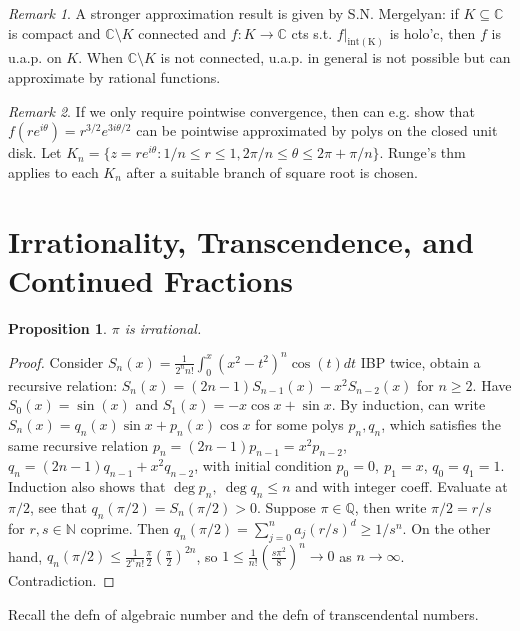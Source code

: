 \documentclass{article}
\theoremstyle{definition}
\theoremstyle{remark}
\newtheorem{rem}{Remark}
\theoremstyle{plain}
\newtheorem{prop}[defn]{Proposition}
\newcommand{\NN}{\mathbb{N}}
\newcommand{\QQ}{\mathbb{Q}}
\newcommand{\CC}{\mathbb{C}}
\begin{document}
\begin{rem}
    A stronger approximation result is given by S.N. Mergelyan: if $K\subseteq\CC$ is compact and $\CC\setminus K$ connected and $f:K\to\CC$ cts s.t. $f|_{\operatorname{int(K)}}$ is holo'c, then $f$ is u.a.p. on $K$.
    When $\CC\setminus K$ is not connected, u.a.p. in general is not possible but can approximate by rational functions.
\end{rem}
\begin{rem}
    If we only require pointwise convergence, then can e.g. show that $f(re^{i\theta})=r^{3/2}e^{3i\theta/2}$ can be pointwise approximated by polys on the closed unit disk. Let $K_n=\{z=re^{i\theta}:1/n\le r\le 1, 2\pi/n\le\theta\le2\pi+\pi/n\}$. Runge's thm applies to each $K_n$ after a suitable branch of square root is chosen.
\end{rem}

\section{Irrationality, Transcendence, and Continued Fractions}
\begin{prop}
    $\pi$ is irrational.
\end{prop}
\begin{proof}
    Consider $S_n(x)=\frac{1}{2^nn!}\int_0^x(x^2-t^2)^n\cos(t)dt$
    IBP twice, obtain a recursive relation: $S_n(x)=(2n-1)S_{n-1}(x)-x^2S_{n-2}(x)$ for $n\ge 2$. Have $S_0(x)=\sin(x)$ and $S_1(x)=-x\cos x+\sin x$. By induction, can write $S_n(x)=q_n(x)\sin x+p_n(x)\cos x$ for some polys $p_n, q_n$, which satisfies the same recursive relation $p_n=(2n-1)p_{n-1}=x^2p_{n-2}$, $q_n=(2n-1)q_{n-1}+x^2q_{n-2}$, with initial condition $p_0=0,\ p_1=x$, $q_0=q_1=1$.
    Induction also shows that $\deg p_n,\ \deg q_n\le n$ and with integer coeff. Evaluate at $\pi/2$, see that $q_n(\pi/2)=S_n(\pi/2)>0$. Suppose $\pi\in\QQ$, then write $\pi/2=r/s$ for $r,s\in\NN$ coprime. Then $q_n(\pi/2)=\sum_{j=0}^na_j(r/s)^d\ge 1/s^n$. On the other hand, $q_n(\pi/2)\le \frac{1}{2^nn!}\frac\pi2(\frac\pi2)^{2n}$, so $1\le \frac{1}{n!}(\frac{s\pi^2}{8})^n\to 0$ as $n\to \infty$. Contradiction.
\end{proof}
Recall the defn of algebraic number and the defn of transcendental numbers.
\end{document}
